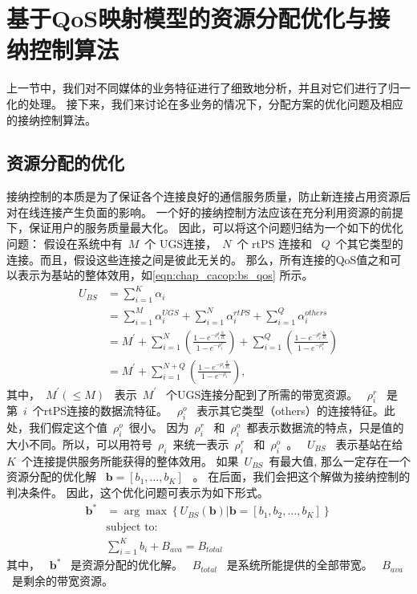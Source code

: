 \section{基于QoS映射模型的资源分配优化与接纳控制算法}
上一节中，我们对不同媒体的业务特征进行了细致地分析，并且对它们进行了归一化的处理。
接下来，我们来讨论在多业务的情况下，分配方案的优化问题及相应的接纳控制算法。
\subsection{资源分配的优化}

接纳控制的本质是为了保证各个连接良好的通信服务质量，防止新连接占用资源后对在线连接产生负面的影响。
一个好的接纳控制方法应该在充分利用资源的前提下，保证用户的服务质量最大化。
因此，可以将这个问题归结为一个如下的优化问题：
假设在系统中有~$M$~个 UGS连接，~$N$~个 rtPS 连接和 ~$Q$~个其它类型的连接。而且，假设这些连接之间是彼此无关的。
那么，所有连接的QoS值之和可以表示为基站的整体效用，如\eqref{eqn:chap_cacop:bs_qos} 所示。
\begin{align}
U_{BS} &= \displaystyle \sum_{i=1}^K \alpha_i \nonumber \\
&= \sum_{i=1}^M\alpha_i^{UGS} + \sum_{i=1}^N\alpha_i^{rtPS} + \sum_{i=1}^Q\alpha_i^{others} \nonumber \\
&=\displaystyle M^\prime + \sum_{i=1}^N \left( \frac{1- e^{-\rho_i^r
\frac{b_i}{B_i} }}{1-e^{-\rho_i^r}} \right)
 + \sum_{i=1}^Q \left( \frac{1- e^{-\rho_i^o
\frac{b_i}{B_i} }}{1-e^{-\rho_i^o}} \right) \nonumber \\
&=\displaystyle M^\prime + \sum_{i=1}^{N+Q} \left( \frac{1- e^{-\rho_i
\frac{b_i}{B_i} }}{1-e^{-\rho_i}} \right), 
\label{eqn:chap_cacop:bs_qos}
\end{align}
其中，~$M^\prime(\le M)$~ 表示~$M^\prime$~ 个UGS连接分配到了所需的带宽资源。
~$\rho_i^r$~ 是第~$i$~个rtPS连接的数据流特征。 
~$\rho_i^o$~ 表示其它类型（others）的连接特征。此处，我们假定这个值~$\rho_i^o$~很小。
因为~$\rho_i^r$~ 和~$\rho_i^o$~都表示数据流的特点，只是值的大小不同。所以，可以用符号~$\rho_i$~来统一表示~$\rho_i^r$~ 和~$\rho_i^o$~。
~$U_{BS}$~ 表示基站在给~$K$~个连接提供服务所能获得的整体效用。
如果~$U_{BS}$~有最大值, 那么一定存在一个资源分配的优化解
~$\mathbf{b} = [b_1, \dots, b_K]$~ 。
在后面，我们会把这个解做为接纳控制的判决条件。
因此，这个优化问题可表示为如下形式。
\begin{align}
\mathbf{b}^* &= \arg \max \left\{ U_{BS}(\mathbf{b}) \big| \mathbf{b} = [b_1, b_2, \dots, b_K] \right\} \label{eqn_u_bs_qos}\\
&\text{subject to:}\nonumber\\
&\displaystyle\sum_{i=1}^{K}b_i + B_{ava}= B_{total} \nonumber
\end{align}
其中， ~$\mathbf{b}^*$~ 是资源分配的优化解。
~$B_{total}$~ 是系统所能提供的全部带宽。
~$ B_{ava} $~是剩余的带宽资源。

